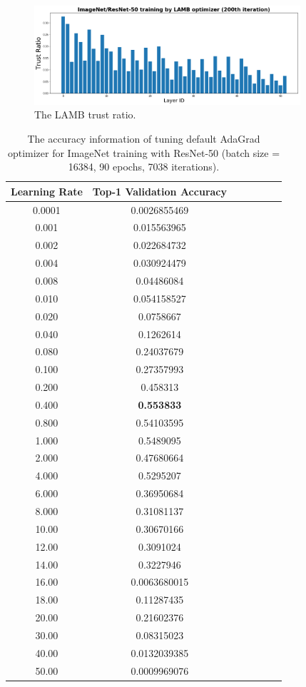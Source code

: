 \begin{figure}[tb]
\vspace{5pt}
\centering
\includegraphics[width=0.88\textwidth]{figs/lamb_ratio_200.png}
\caption{The LAMB trust ratio.}
\label{fig:lamb_ratio_200}
\vspace{-10pt}
\end{figure}

\begin{table}[ht]
\renewcommand{\arraystretch}{1.3}
\caption{The accuracy information of tuning default AdaGrad optimizer for ImageNet training with ResNet-50 (batch size = 16384, 90 epochs, 7038 iterations).}
\centering
\begin{tabular}{|c|c|c|c|c|c|c|}
\hline
Learning Rate & Top-1 Validation Accuracy \\
\hline
\hline
0.0001 & 0.0026855469 \\
\hline
0.001 & 0.015563965 \\
\hline
0.002 & 0.022684732 \\
\hline
0.004 & 0.030924479 \\
\hline
0.008 & 0.04486084 \\
\hline
0.010 & 0.054158527 \\
\hline
0.020 & 0.0758667 \\
\hline
0.040 & 0.1262614 \\
\hline
0.080 & 0.24037679 \\
\hline
0.100 & 0.27357993 \\
\hline
0.200 & 0.458313 \\
\hline
0.400 & {\bf 0.553833} \\
\hline
0.800 & 0.54103595 \\
\hline
1.000 & 0.5489095 \\
\hline
2.000 & 0.47680664 \\
\hline
4.000 & 0.5295207 \\
\hline
6.000 & 0.36950684 \\
\hline
8.000 & 0.31081137 \\
\hline
10.00 & 0.30670166 \\
\hline
12.00 & 0.3091024 \\
\hline
14.00 & 0.3227946 \\
\hline
16.00 & 0.0063680015 \\
\hline
18.00 & 0.11287435 \\
\hline
20.00 & 0.21602376 \\
\hline
30.00 & 0.08315023 \\
\hline
40.00 & 0.0132039385 \\
\hline
50.00 & 0.0009969076 \\
\hline
\end{tabular}
\label{table:imagenet_adagrad_tuning_1}
\end{table}

